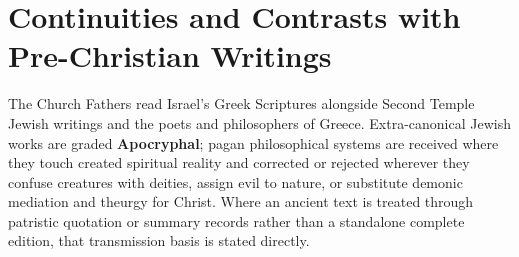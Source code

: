 \section{Continuities and Contrasts with Pre-Christian Writings}
\label{app:pre-christian}

The Church Fathers read Israel's Greek Scriptures alongside Second Temple Jewish writings and the poets and philosophers of Greece. Extra-canonical Jewish works are graded \textbf{Apocryphal}; pagan philosophical systems are received where they touch created spiritual reality and corrected or rejected wherever they confuse creatures with deities, assign evil to nature, or substitute demonic mediation and theurgy for Christ. Where an ancient text is treated through patristic quotation or summary records rather than a standalone complete edition, that transmission basis is stated directly.

